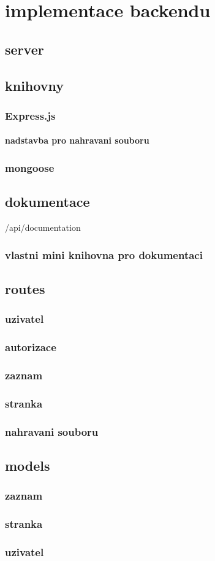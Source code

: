 \chapter{implementace backendu}

\section{server}


\section{knihovny}

\subsection{Express.js}

\subsubsection{nadstavba pro nahravani souboru}

\subsection{mongoose}


\section{dokumentace}
/api/documentation
\subsection{vlastni mini knihovna pro dokumentaci}

\section{routes}
\subsection{uzivatel}
\subsection{autorizace}
\subsection{zaznam}
\subsection{stranka}
\subsection{nahravani souboru}

\section{models}
\subsection{zaznam}
\subsection{stranka}
\subsection{uzivatel}

